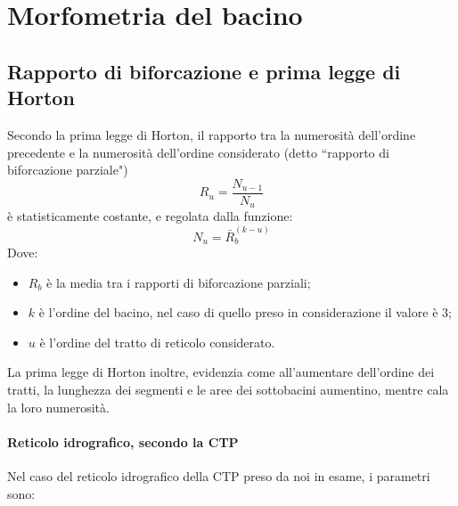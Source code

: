 \section{Morfometria del bacino}
\subsection{Rapporto di biforcazione e prima legge di Horton}
Secondo la prima legge di Horton, il rapporto tra la numerosità dell'ordine precedente e la numerosità dell'ordine considerato (detto ``rapporto di biforcazione parziale")
\begin{equation}
    R_u = \frac{N_{u-1}}{N_u}
\end{equation}
è statisticamente costante, e regolata dalla funzione:
\begin{equation}
    N_u= \bar{R}_b ^{(k-u)}
\end{equation}
Dove: 
\begin{itemize}
    \item $R_b$ è la media tra i rapporti di biforcazione parziali;
    \item $k$ è l'ordine del bacino, nel caso di quello preso in considerazione il valore è 3;
    \item $u$ è l'ordine del tratto di reticolo considerato.
\end{itemize}
La prima legge di Horton inoltre, evidenzia come all'aumentare dell'ordine dei tratti, la lunghezza dei segmenti e le aree dei sottobacini aumentino, mentre cala la loro numerosità.\\
\paragraph{Reticolo idrografico, secondo la CTP} Nel caso del reticolo idrografico della CTP preso da noi in esame, i parametri sono: 

